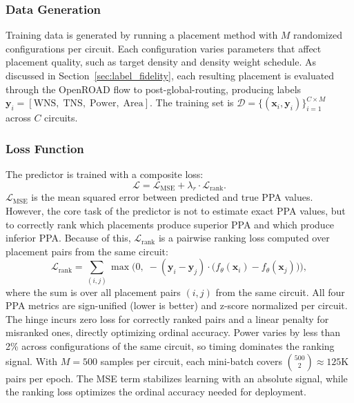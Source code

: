\documentclass[sigconf,anonymous,review,9pt]{acmart}
\begin{document}
\subsubsection{Data Generation}

Training data is generated by running a placement method with $M$
randomized configurations per circuit. Each configuration varies
parameters that affect placement quality, such as target density and
density weight schedule. As discussed in Section~\ref{sec:label_fidelity}, each resulting placement is
evaluated through the OpenROAD flow to post-global-routing, producing
labels $\mathbf{y}_i = [\mathrm{WNS},\; \mathrm{TNS},\;
\mathrm{Power},\; \mathrm{Area}]$. The training set is
$\mathcal{D} = \{(\mathbf{x}_i, \mathbf{y}_i)\}_{i=1}^{C \times M}$
across $C$ circuits.

\subsubsection{Loss Function}

The predictor is trained with a composite loss:
\begin{equation}
\label{eq:loss}
\mathcal{L} = \mathcal{L}_{\mathrm{MSE}}
+ \lambda_r \cdot \mathcal{L}_{\mathrm{rank}}.
\end{equation}
$\mathcal{L}_{\mathrm{MSE}}$ is the mean squared error between
predicted and true PPA values. However, the core task of the predictor is not to estimate exact PPA values,
but to correctly rank which placements produce superior PPA and which produce inferior PPA.
Because of this, $\mathcal{L}_{\mathrm{rank}}$ is a pairwise ranking loss
computed over placement pairs from the same circuit:
\begin{equation}
\label{eq:ranking}
\mathcal{L}_{\mathrm{rank}} = \sum_{(i,j)}
\max\!\Big(0,\; -(\mathbf{y}_i - \mathbf{y}_j) \cdot
\big(f_\theta(\mathbf{x}_i) - f_\theta(\mathbf{x}_j)\big)\Big),
\end{equation}
where the sum is over all placement pairs $(i, j)$ from the same
circuit. All four PPA metrics are sign-unified (lower is better) and
z-score normalized per circuit. The hinge incurs zero loss for
correctly ranked pairs and a linear penalty for misranked ones,
directly optimizing ordinal accuracy. Power varies by less than 2\%
across configurations of the same circuit, so timing dominates the
ranking signal. With $M = 500$ samples per circuit, each mini-batch
covers $\binom{500}{2} \approx 125$K pairs per epoch.
The MSE term stabilizes learning with an absolute signal, while
the ranking loss optimizes the ordinal accuracy needed for deployment.
\end{document}
